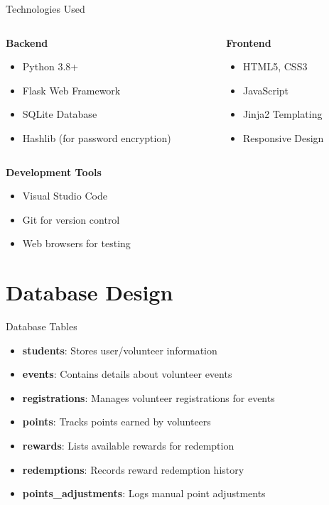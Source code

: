 \documentclass{beamer}
\begin{document}
\begin{frame}{Technologies Used}
  \begin{columns}
    \begin{column}{0.5\textwidth}
      \textbf{Backend}
      \begin{itemize}
        \item Python 3.8+
        \item Flask Web Framework
        \item SQLite Database
        \item Hashlib (for password encryption)
      \end{itemize}
    \end{column}
    \begin{column}{0.5\textwidth}
      \textbf{Frontend}
      \begin{itemize}
        \item HTML5, CSS3
        \item JavaScript
        \item Jinja2 Templating
        \item Responsive Design
      \end{itemize}
    \end{column}
  \end{columns}
  
  \vspace{0.5cm}
  \textbf{Development Tools}
  \begin{itemize}
    \item Visual Studio Code
    \item Git for version control
    \item Web browsers for testing
  \end{itemize}
\end{frame}

\section{Database Design}

\begin{frame}{Database Tables}
  \begin{itemize}
    \item \textbf{students}: Stores user/volunteer information
    \item \textbf{events}: Contains details about volunteer events
    \item \textbf{registrations}: Manages volunteer registrations for events
    \item \textbf{points}: Tracks points earned by volunteers
    \item \textbf{rewards}: Lists available rewards for redemption
    \item \textbf{redemptions}: Records reward redemption history
    \item \textbf{points\_adjustments}: Logs manual point adjustments
  \end{itemize}
\end{frame}
\end{document}
